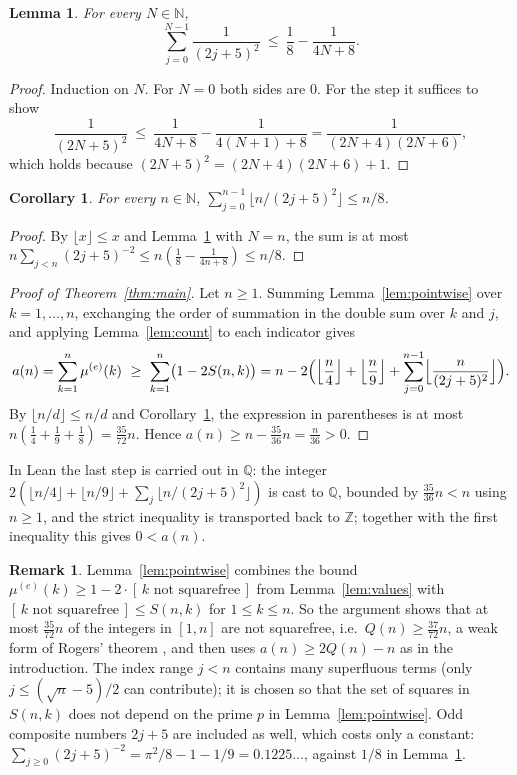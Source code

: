 \documentclass[11pt]{amsart}
\theoremstyle{plain}
\newtheorem{lemma}[theorem]{Lemma}
\newtheorem{corollary}[theorem]{Corollary}
\theoremstyle{definition}
\newtheorem{remark}[theorem]{Remark}
\newcommand{\N}{\mathbb{N}}
\newcommand{\Z}{\mathbb{Z}}
\newcommand{\Q}{\mathbb{Q}}
\newcommand{\mue}{\mu^{(e)}}
\newcommand{\ind}[1]{[\,#1\,]}
\begin{document}
\begin{lemma}\label{lem:tele}
For every $N\in\N$,
\[
  \sum_{j=0}^{N-1}\frac{1}{(2j+5)^2}\ \le\ \frac18-\frac{1}{4N+8}.
\]
\end{lemma}

\begin{proof}
Induction on $N$. For $N=0$ both sides are $0$. For the step it suffices to show
\[
  \frac{1}{(2N+5)^2}\ \le\ \frac{1}{4N+8}-\frac{1}{4(N+1)+8}=\frac{1}{(2N+4)(2N+6)},
\]
which holds because $(2N+5)^2=(2N+4)(2N+6)+1$.
\end{proof}

\begin{corollary}\label{cor:tail}
For every $n\in\N$, $\sum_{j=0}^{n-1}\lfloor n/(2j+5)^2\rfloor\le n/8$.
\end{corollary}

\begin{proof}
By $\lfloor x\rfloor\le x$ and Lemma~\ref{lem:tele} with $N=n$, the sum is at most $n\sum_{j<n}(2j+5)^{-2}\le n(\tfrac18-\tfrac1{4n+8})\le n/8$.
\end{proof}

\begin{proof}[Proof of Theorem~\ref{thm:main}]
Let $n\ge1$. Summing Lemma~\ref{lem:pointwise} over $k=1,\dots,n$, exchanging the order of summation in the double sum over $k$ and $j$, and applying Lemma~\ref{lem:count} to each indicator gives
\[
  a(n)=\sum_{k=1}^{n}\mue(k)\ \ge\ \sum_{k=1}^{n}\bigl(1-2S(n,k)\bigr)
  = n-2\Bigl(\Bigl\lfloor\frac n4\Bigr\rfloor+\Bigl\lfloor\frac n9\Bigr\rfloor+\sum_{j=0}^{n-1}\Bigl\lfloor\frac{n}{(2j+5)^2}\Bigr\rfloor\Bigr).
\]
By $\lfloor n/d\rfloor\le n/d$ and Corollary~\ref{cor:tail}, the expression in parentheses is at most $n(\tfrac14+\tfrac19+\tfrac18)=\tfrac{35}{72}n$. Hence $a(n)\ge n-\tfrac{35}{36}n=\tfrac{n}{36}>0$.
\end{proof}

In Lean the last step is carried out in $\Q$: the integer $2(\lfloor n/4\rfloor+\lfloor n/9\rfloor+\sum_j\lfloor n/(2j+5)^2\rfloor)$ is cast to $\Q$, bounded by $\tfrac{35}{36}n<n$ using $n\ge1$, and the strict inequality is transported back to $\Z$; together with the first inequality this gives $0<a(n)$.

\begin{remark}\label{rem:density}
Lemma~\ref{lem:pointwise} combines the bound $\mue(k)\ge 1-2\cdot\ind{k\text{ not squarefree}}$ from Lemma~\ref{lem:values} with $\ind{k\text{ not squarefree}}\le S(n,k)$ for $1\le k\le n$. So the argument shows that at most $\tfrac{35}{72}n$ of the integers in $[1,n]$ are not squarefree, i.e.\ $Q(n)\ge\tfrac{37}{72}n$, a weak form of Rogers' theorem \cite{Rogers}, and then uses $a(n)\ge 2Q(n)-n$ as in the introduction. The index range $j<n$ contains many superfluous terms (only $j\le(\sqrt n-5)/2$ can contribute); it is chosen so that the set of squares in $S(n,k)$ does not depend on the prime $p$ in Lemma~\ref{lem:pointwise}. Odd composite numbers $2j+5$ are included as well, which costs only a constant: $\sum_{j\ge0}(2j+5)^{-2}=\pi^2/8-1-1/9=0.1225\ldots$, against $1/8$ in Lemma~\ref{lem:tele}.
\end{remark}
\end{document}
